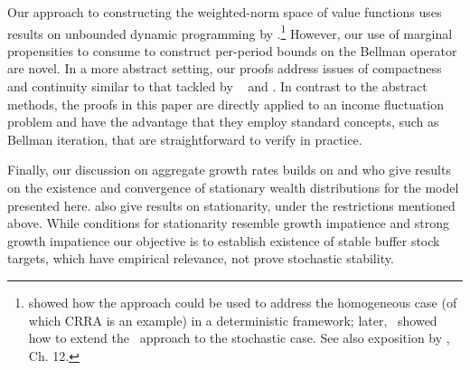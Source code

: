 \documentclass[BufferStockTheory]{subfiles}
\begin{document}
% 

Our approach to constructing the weighted-norm space of value functions uses results on unbounded dynamic programming by  \citep{jboydWeighted}.\footnote{\cite{asHomogeneous} showed how the approach could be used to address the homogeneous case (of which CRRA is an example) in a deterministic framework; later,~\cite{duranDiscounting} showed how to extend the~\cite{jboydWeighted} approach to the stochastic case.
See also exposition by \cite{stachurski2022}, Ch.
12.} However, our use of marginal propensities to consume to construct per-period bounds on the Bellman operator are novel.
In a more abstract setting, our proofs address issues of compactness and continuity similar to that tackled by ~\cite{Feinberg2012} and  \cite{Shanker2017a}.
In contrast to the abstract methods, the proofs in this paper are directly applied to an income fluctuation problem and have the advantage that they employ standard concepts, such as Bellman iteration, that are straightforward to verify in practice.

% 

Finally, our discussion on aggregate growth rates builds on \cite{szeidlInvariant} and \cite{harmenbergInvariant} who give results on the existence and convergence of stationary wealth distributions for the model presented here.
\cite{mstIncFluct} also give results on stationarity, under the restrictions mentioned above.
While conditions for stationarity resemble growth impatience and strong growth impatience our objective is to establish existence of stable buffer stock targets, which have empirical relevance, not prove stochastic stability.


\end{document}
